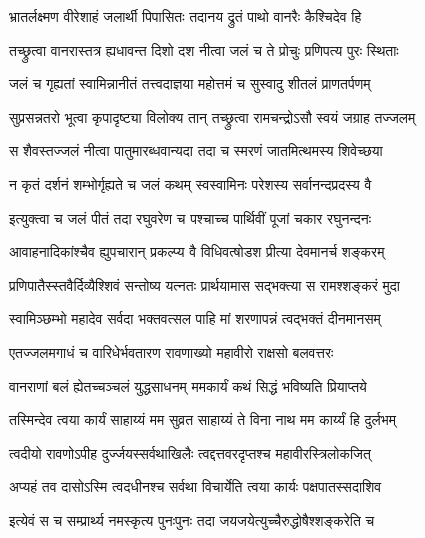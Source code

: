\twolineshloka
{भ्रातर्लक्ष्मण वीरेशाहं जलार्थी पिपासितः}
{तदानय द्रुतं पाथो वानरैः कैश्चिदेव हि} %


\twolineshloka
{तच्छ्रुत्वा वानरास्तत्र ह्यधावन्त दिशो दश} 
{नीत्वा जलं च ते प्रोचुः प्रणिपत्य पुरः स्थिताः} %


\twolineshloka
{जलं च गृह्यतां स्वामिन्नानीतं तत्त्वदाज्ञया}
{महोत्तमं च सुस्वादु शीतलं प्राणतर्पणम्} %


\twolineshloka
{सुप्रसन्नतरो भूत्वा कृपादृष्ट्या विलोक्य तान् }
{तच्छ्रुत्वा रामचन्द्रोऽसौ स्वयं जग्राह तज्जलम्} %

\twolineshloka
{स शैवस्तज्जलं नीत्वा पातुमारब्धवान्यदा} 
{तदा च स्मरणं जातमित्थमस्य शिवेच्छया} %

\twolineshloka
{न कृतं दर्शनं शम्भोर्गृह्यते च जलं कथम्}
{स्वस्वामिनः परेशस्य सर्वानन्दप्रदस्य वै} %

\twolineshloka
{इत्युक्त्वा च जलं पीतं तदा रघुवरेण च}
{पश्चाच्च पार्थिवीं पूजां चकार रघुनन्दनः} %

\twolineshloka
{आवाहनादिकांश्चैव ह्युपचारान् प्रकल्प्य वै}
{विधिवत्षोडश प्रीत्या देवमानर्च शङ्करम्} %

\twolineshloka
{प्रणिपातैस्स्तवैर्दिव्यैश्शिवं सन्तोष्य यत्नतः}
{प्रार्थयामास सद्भक्त्या स रामश्शङ्करं मुदा} %


\twolineshloka
{स्वामिञ्छम्भो महादेव सर्वदा भक्तवत्सल} 
{पाहि मां शरणापन्नं त्वद्भक्तं दीनमानसम्} %

\twolineshloka
{एतज्जलमगाधं च वारिधेर्भवतारण}
{रावणाख्यो महावीरो राक्षसो बलवत्तरः} %

\twolineshloka
{वानराणां बलं ह्येतच्चञ्चलं युद्धसाधनम्}
{ममकार्यं कथं सिद्धं भविष्यति प्रियाप्तये} %

\twolineshloka
{तस्मिन्देव त्वया कार्यं साहाय्यं मम सुव्रत} 
{साहाय्यं ते विना नाथ मम कार्य्यं हि दुर्लभम्} %

\twolineshloka
{त्वदीयो रावणोऽपीह दुर्ज्जयस्सर्वथाखिलैः} 
{त्वद्दत्तवरदृप्तश्च महावीरस्त्रिलोकजित्} %

\twolineshloka
{अप्यहं तव दासोऽस्मि त्वदधीनश्च सर्वथा} 
{विचार्येति त्वया कार्यः पक्षपातस्सदाशिव} %


\twolineshloka
{इत्येवं स च सम्प्रार्थ्य नमस्कृत्य पुनःपुनः} 
{तदा जयजयेत्युच्चैरुद्धोषैश्शङ्करेति च} %

